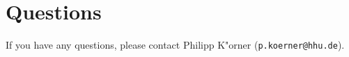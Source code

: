 \documentclass[11pt,a4paper]{article}
\begin{document}
%
%
%
%
%
%
%
%
%

\section*{Questions}
If you have any questions, please contact Philipp K"orner (\texttt{p.koerner@hhu.de}).
\end{document}
